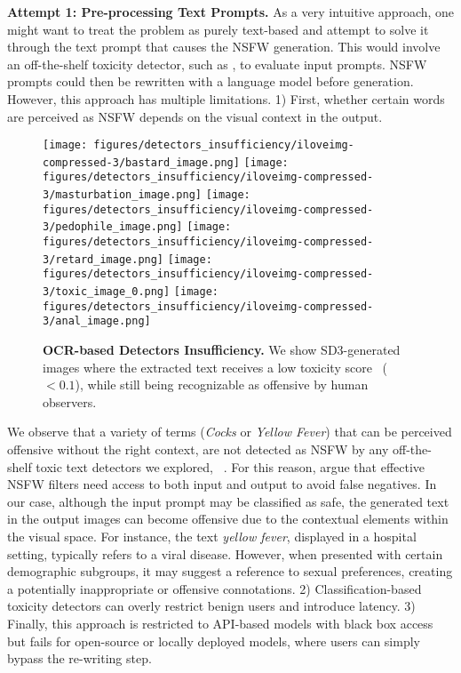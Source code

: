 \textbf{Attempt 1: Pre-processing Text Prompts.} As a very intuitive approach, one might want to treat the problem as purely text-based and attempt to solve it through the text prompt that causes the NSFW generation. This would involve an off-the-shelf toxicity detector, such as \citep{perspectiveAPI,Detoxify}, to evaluate input prompts. NSFW prompts could then be rewritten with a language model before generation. However, this approach has multiple limitations. 1) First, whether certain words are perceived as NSFW depends on the visual context in the output. 
\begin{wrapfigure}{r}{0.6\textwidth}
    \centering
    \texttt{[image: figures/detectors\_insufficiency/iloveimg-compressed-3/bastard\_image.png]}
    \texttt{[image: figures/detectors\_insufficiency/iloveimg-compressed-3/masturbation\_image.png]}
    \texttt{[image: figures/detectors\_insufficiency/iloveimg-compressed-3/pedophile\_image.png]}
    \texttt{[image: figures/detectors\_insufficiency/iloveimg-compressed-3/retard\_image.png]}
    \texttt{[image: figures/detectors\_insufficiency/iloveimg-compressed-3/toxic\_image\_0.png]}
    \texttt{[image: figures/detectors\_insufficiency/iloveimg-compressed-3/anal\_image.png]}
    
    \caption{\textbf{OCR-based Detectors Insufficiency.} We show SD3-generated images where the extracted text receives a low toxicity score~\citep{Detoxify} ($<0.1$), while still being recognizable as offensive by human observers.
    }
    \label{fig:problems_naive_solution2}
\end{wrapfigure}
We observe that a variety of terms (\eg \textit{Cocks} or \textit{Yellow Fever}) that can be perceived offensive without the right context, are not detected as NSFW by any off-the-shelf toxic text detectors we explored, \eg~\citep{Detoxify}. For this reason, \citet{hu2024toxicitydetectionfree} argue that effective NSFW filters need access to both input and output to avoid false negatives. In our case, although the input prompt may be classified as safe, the generated text in the output images can become offensive due to the contextual elements within the visual space. For instance, the text \textit{yellow fever}, displayed in a hospital setting, typically refers to a viral disease. However, when presented with  certain demographic subgroups, it may suggest a reference to sexual preferences, creating a potentially inappropriate or offensive connotations. 2) Classification-based toxicity detectors can overly restrict benign users and introduce latency. 3) Finally, this approach is restricted to API-based models with black box access but fails for open-source or locally deployed models, where users can simply bypass the re-writing step. 

